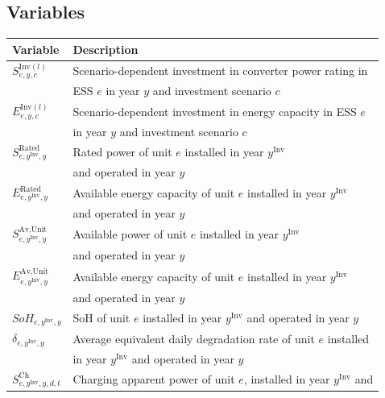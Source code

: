 \documentclass[preprint,12pt]{elsarticle}
\begin{document}
\subsection*{Variables}

\begin{table}[htbp!]
    \centering
    \begin{tabular}{l l}
        \toprule
        \textbf{Variable} & \textbf{Description} \\
        \midrule
        $S^{\text{Inv}(l)}_{e,y,c}$ & Scenario-dependent investment in converter power rating in \\
        ~                           & ESS $e$ in year $y$ and investment scenario $c$\\
        $E^{\text{Inv}(l)}_{e,y,c}$ & Scenario-dependent investment in energy capacity in ESS $e$ \\
        ~                           & in year $y$ and investment scenario $c$\\
        $S^{\text{Rated}}_{e,y^\text{Inv},y}$   & Rated power of unit $e$ installed in year $y^\text{Inv}$ \\
        ~                                       & and operated in year $y$ \\
        $E^{\text{Rated}}_{e,y^\text{Inv},y}$ & Available energy capacity of unit $e$ installed in year $y^\text{Inv}$\\
        ~                                       & and operated in year $y$ \\
        $S^{\text{Av,Unit}}_{e,y^\text{Inv},y}$ & Available power of unit $e$ installed in year $y^\text{Inv}$ \\
        ~                                       & and operated in year $y$ \\
        $E^{\text{Av,Unit}}_{e,y^\text{Inv},y}$ & Available energy capacity of unit $e$ installed in year $y^\text{Inv}$\\
        ~                                       & and operated in year $y$ \\
        $SoH_{e,y^\text{Inv},y}$ & SoH of unit $e$ installed in year $y^\text{Inv}$ and operated in year $y$ \\
        $\delta_{e,y^\text{Inv},y}$ & Average equivalent daily degradation rate of unit $e$ installed \\
        ~                           & in year $y^\text{Inv}$ and operated in year $y$ \\
        $S^\text{Ch}_{e,y^\text{Inv},y,d,t}$ & Charging apparent power of unit $e$, installed in year $y^\text{Inv}$ and\\

\end{tabular}
\end{table}
\end{document}
